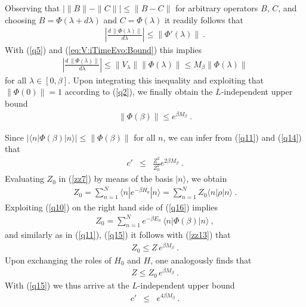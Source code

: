\documentclass[twocolumn,aps,prb,floatfix,superscriptaddress]{revtex4-2}
\newcommand{\<}{\left\langle}	%
\renewcommand{\>}{\right\rangle}	%
\providecommand{\norm}[1]{\|#1\|}
\begin{document}
Observing that $|\norm{B}-\norm{C}|\leq \norm{B-C}$ for arbitrary operators $B$, $C$, 
and choosing $B=\Phi(\lambda +d\lambda)$ and $C=\Phi(\lambda)$ it readily follows that
\begin{eqnarray}
\left| \frac{d\, \norm{\Phi(\lambda)}}{d\lambda}\right| \leq \norm{\Phi'(\lambda)}
\ .
\label{q12}
\end{eqnarray}
With (\ref{q5}) and (\ref{eq:V:iTimeEvo:Bound}) this implies
\begin{eqnarray}
\left| \frac{d\, \norm{\Phi(\lambda)}}{d\lambda}\right| \leq \norm{V_\lambda}
 \norm{\Phi(\lambda)}\leq M_\beta  \norm{\Phi(\lambda)}
\label{q13}
\end{eqnarray}
for all $\lambda\in[0,\beta]$.
Upon integrating this inequality and exploiting
that $\norm{\Phi(0)}=1$ according to (\ref{q2}), we finally obtain
the $L$-independent upper bound
\begin{eqnarray}
\norm{\Phi(\beta)}\leq e^{\beta M_\beta}
\ .
\label{q14}
\end{eqnarray}

Since $|\langle n| \Phi(\beta) | n \rangle|\leq\norm{\Phi(\beta)}$ for all $n$, we
can infer from (\ref{q11}) and (\ref{q14}) that
\begin{eqnarray}
c' &  \leq & \frac{Z^2}{Z_0^2} e^{2 \beta M_\beta}
\ .
\label{q15}
\end{eqnarray}
Evaluating $Z_0$ in (\ref{zz7}) by means of the basis $|n\rangle$, we obtain
\begin{eqnarray}
Z_0=\sum_{n=1}^N \langle n|e^{-\beta H_0}|n\rangle=
\sum_{n=1}^N Z_0 \langle n|\rho|n\rangle
\ .
\label{q16}
\end{eqnarray}
Exploiting (\ref{q10}) on the right hand side of (\ref{q16})
implies
\begin{eqnarray}
Z_0=\sum_{n=1}^N e^{-\beta E_n} \, \langle n| \Phi(\beta) | n \rangle 
\ ,
\label{q17}
\end{eqnarray}
and similarly as in (\ref{q11}), (\ref{q15}) it follows with (\ref{zz13}) that
\begin{eqnarray}
Z_0\leq Z\, e^{\beta M_\beta}
\ .
\label{q18}
\end{eqnarray}
Upon exchanging the roles of $H_0$ and $H$, one analogously finds that
\begin{eqnarray}
Z\leq Z_0\, e^{\beta M_\beta}
\ .
\label{q19}
\end{eqnarray}
With (\ref{q15}) we thus arrive at
the $L$-independent upper bound
\begin{eqnarray}
c' &  \leq & e^{4 \beta M_\beta}
\ .
\label{q20}
\end{eqnarray}
\end{document}
